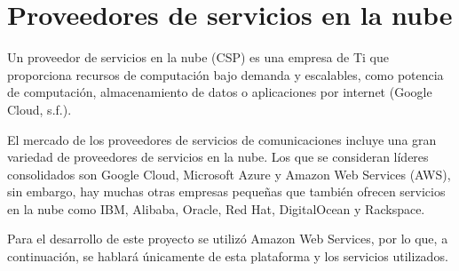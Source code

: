 \section{Proveedores de servicios en la nube}
Un proveedor de servicios en la nube (CSP) es una empresa de Ti que proporciona recursos de computación bajo demanda y escalables, como potencia de computación, almacenamiento de datos o aplicaciones por internet (Google Cloud, s.f.).

El mercado de los proveedores de servicios de comunicaciones incluye una gran variedad de proveedores de servicios en la nube. Los que se consideran líderes consolidados son Google Cloud, Microsoft Azure y Amazon Web Services (AWS), sin embargo, hay muchas otras empresas pequeñas que también ofrecen servicios en la nube como IBM, Alibaba, Oracle, Red Hat, DigitalOcean y Rackspace. 

Para el desarrollo de este proyecto se utilizó Amazon Web Services, por lo que, a continuación, se hablará únicamente de esta plataforma y los servicios utilizados.
    